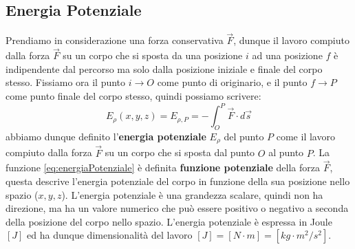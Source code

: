         \subsection{Energia Potenziale}
            Prendiamo in considerazione una forza conservativa $\vec{F}$, dunque il lavoro compiuto dalla forza $\vec{F}$ su un corpo che si sposta da una posizione $i$ ad una posizione $f$ è indipendente dal percorso ma solo dalla posizione iniziale e finale del corpo stesso. Fissiamo ora il punto $i\rightarrow O$ come punto di originario, e il punto $f\rightarrow P$ come punto finale del corpo stesso, quindi possiamo scrivere:
            \begin{equation}
                E_{\rho}(x,y,z)=E_{\rho,P}=-\int_{O}^{P} \vec{F}\cdot d\vec{s} \label{eq:energiaPotenziale}
            \end{equation}
            abbiamo dunque definito l'\textbf{energia potenziale} $E_{\rho}$ del punto $P$ come il lavoro compiuto dalla forza $\vec{F}$ su un corpo che si sposta dal punto $O$ al punto $P$. La funzione \ref{eq:energiaPotenziale} è definita \textbf{funzione potenziale} della forza $\vec{F}$, questa descrive l'energia potenziale del corpo in funzione della sua posizione nello spazio ($x,y,z$). L'energia potenziale è una grandezza scalare, quindi non ha direzione, ma ha un valore numerico che può essere positivo o negativo a seconda della posizione del corpo nello spazio. L'energia potenziale è espressa in Joule $[J]$ ed ha dunque dimensionalità del lavoro $[J] = [N\cdot m] = [kg\cdot m^2/s^2]$.
